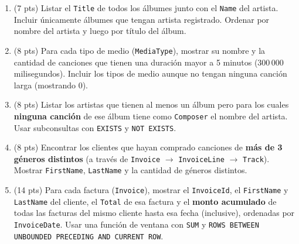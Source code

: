 \documentclass[11pt,a4paper]{article}
\begin{document}
\begin{enumerate}

  \item (7 pts) Listar el \texttt{Title} de todos los álbumes junto con el \texttt{Name} del artista. Incluir únicamente álbumes que tengan artista registrado. Ordenar por nombre del artista y luego por título del álbum.

  \vspace{4cm}

  \item (8 pts) Para cada tipo de medio (\texttt{MediaType}), mostrar su nombre y la cantidad de canciones que tienen una duración mayor a 5 minutos (300\,000 milisegundos). Incluir los tipos de medio aunque no tengan ninguna canción larga (mostrando 0).

  \vspace{4.5cm}

  \item (8 pts) Listar los artistas que tienen al menos un álbum pero para los cuales \textbf{ninguna canción} de ese álbum tiene como \texttt{Composer} el nombre del artista. Usar subconsultas con \texttt{EXISTS} y \texttt{NOT EXISTS}.

  \vspace{5cm}

  \item (8 pts) Encontrar los clientes que hayan comprado canciones de \textbf{más de 3 géneros distintos} (a través de \texttt{Invoice} $\to$ \texttt{InvoiceLine} $\to$ \texttt{Track}). Mostrar \texttt{FirstName}, \texttt{LastName} y la cantidad de géneros distintos.

  \vspace{5cm}

  \item (14 pts) Para cada factura (\texttt{Invoice}), mostrar el \texttt{InvoiceId}, el \texttt{FirstName} y \texttt{LastName} del cliente, el \texttt{Total} de esa factura y el \textbf{monto acumulado} de todas las facturas del mismo cliente hasta esa fecha (inclusive), ordenadas por \texttt{InvoiceDate}. Usar una función de ventana con \texttt{SUM} y \texttt{ROWS BETWEEN UNBOUNDED PRECEDING AND CURRENT ROW}.

  \vspace{5.5cm}

\end{enumerate}
\end{document}

